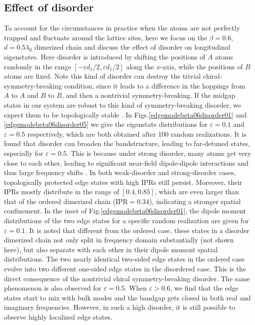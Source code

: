 \documentclass[aps,pra,reprint,groupedaddress,nofootinbib,longbibliography,showpacs]{revtex4-1}
\begin{document}
\subsection{Effect of disorder}
To account for the circumstances in practice when the atoms are not perfectly trapped and fluctuate around the lattice sites, here we focus on the $\beta=0.6$, $d=0.5\lambda_0$ dimerized chain and discuss the effect of disorder on longitudinal eigenstates. Here disorder is introduced by shifting the positions of $A$ atoms randomly in the range $[-\varepsilon d_1/2,\varepsilon d_1/2]$ along the $x$-axis, while the positions of $B$ atoms are fixed. Note this kind of disorder can destroy the trivial chiral-symmetry-breaking condition, since it leads to a difference in the hoppings from $A$ to $A$ and $B$ to $B$, and then a nontrivial symmetry-breaking. If the midgap states in our system are robust to this kind of symmetry-breaking disorder, we expect them to be topologically stable \cite{stjeanNaturephoton2017}. In Figs.\ref{edgemodebeta06disorder01} and \ref{edgemodebeta06disorder05} we give the eigenstate distributions for $\varepsilon=0.1$ and $\varepsilon=0.5$ respectively, which are both obtained after 100 random realizations. It is found that disorder can broaden the bandstructure, leading to far-detuned states, especially for $\varepsilon=0.5$. This is because under strong disorder, many atoms get very close to each other, leading to significant near-field dipole-dipole interactions and thus large frequency shifts \cite{wangOL2018}. In both weak-disorder and strong-disorder cases, topologically protected edge states with high IPRs still persist. Moreover, their IPRs mostly distribute in the range of $[0.4,0.85]$, which are even larger than that of the ordered dimerized chain ($\mathrm{IPR}=0.34$), indicating a stronger spatial confinement. In the inset of Fig.\ref{edgemodebeta06disorder01}, the dipole moment distributions of the two edge states for a specific random realization are given for $\varepsilon=0.1$. It is noted that different from the ordered case, these states in a disorder dimerized chain not only split in frequency domain substantially (not shown here), but also separate with each other in their dipole moment spatial distributions. The two nearly identical two-sided edge states in the ordered case evolve into two different one-sided edge states in the disordered case. This is the direct consequence of the nontrivial chiral symmetry-breaking disorder. The same phenomenon is also observed for $\varepsilon=0.5$. When $\varepsilon>0.6$, we find that the edge states start to mix with bulk modes and the bandgap gets closed in both real and imaginary frequencies. However, in such a high disorder, it is still possible to observe highly localized edge states. 
\end{document}
